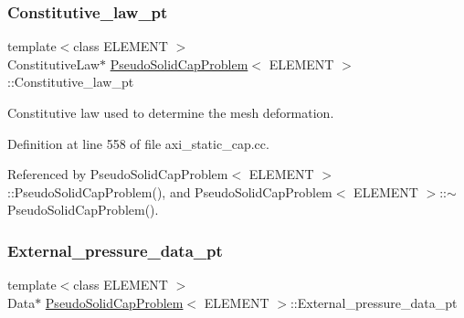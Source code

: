 \mbox{\label{classPseudoSolidCapProblem_ab9d26ab5daa295e7ac4cdca1802ec156}} 
\subsubsection{\texorpdfstring{Constitutive\+\_\+law\+\_\+pt}{Constitutive\_law\_pt}}
{\footnotesize\ttfamily template$<$class E\+L\+E\+M\+E\+NT $>$ \\
Constitutive\+Law$\ast$ \hyperlink{classPseudoSolidCapProblem}{Pseudo\+Solid\+Cap\+Problem}$<$ E\+L\+E\+M\+E\+NT $>$\+::Constitutive\+\_\+law\+\_\+pt\hspace{0.3cm}{\ttfamily [private]}}



Constitutive law used to determine the mesh deformation. 



Definition at line 558 of file axi\+\_\+static\+\_\+cap.\+cc.



Referenced by Pseudo\+Solid\+Cap\+Problem$<$ E\+L\+E\+M\+E\+N\+T $>$\+::\+Pseudo\+Solid\+Cap\+Problem(), and Pseudo\+Solid\+Cap\+Problem$<$ E\+L\+E\+M\+E\+N\+T $>$\+::$\sim$\+Pseudo\+Solid\+Cap\+Problem().

\mbox{\label{classPseudoSolidCapProblem_a51ac066b9117f30679fef658ff66d981}} 
\subsubsection{\texorpdfstring{External\+\_\+pressure\+\_\+data\+\_\+pt}{External\_pressure\_data\_pt}}
{\footnotesize\ttfamily template$<$class E\+L\+E\+M\+E\+NT $>$ \\
Data$\ast$ \hyperlink{classPseudoSolidCapProblem}{Pseudo\+Solid\+Cap\+Problem}$<$ E\+L\+E\+M\+E\+NT $>$\+::External\+\_\+pressure\+\_\+data\+\_\+pt\hspace{0.3cm}{\ttfamily [private]}}



